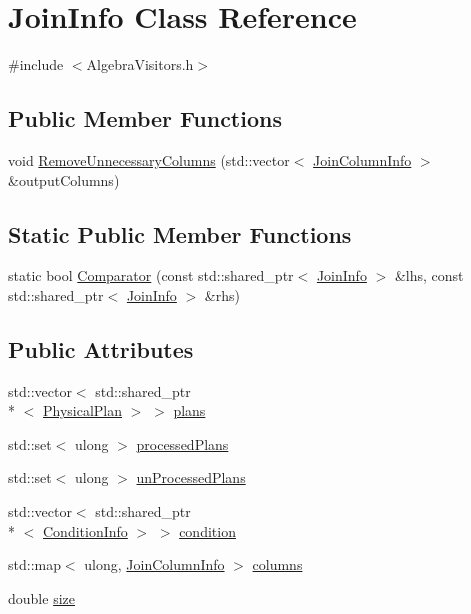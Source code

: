 \hypertarget{class_join_info}{\section{Join\+Info Class Reference}
\label{class_join_info}
}


{\ttfamily \#include $<$Algebra\+Visitors.\+h$>$}

\subsection*{Public Member Functions}
\begin{DoxyCompactItemize}
\item 
void \hyperlink{class_join_info_aa4c03bd8c1d0a7f4a5b89287d69f89b5}{Remove\+Unnecessary\+Columns} (std\+::vector$<$ \hyperlink{class_join_column_info}{Join\+Column\+Info} $>$ \&output\+Columns)
\end{DoxyCompactItemize}
\subsection*{Static Public Member Functions}
\begin{DoxyCompactItemize}
\item 
static bool \hyperlink{class_join_info_ae7be09d7cdeb95ad59d9352ee37de990}{Comparator} (const std\+::shared\+\_\+ptr$<$ \hyperlink{class_join_info}{Join\+Info} $>$ \&lhs, const std\+::shared\+\_\+ptr$<$ \hyperlink{class_join_info}{Join\+Info} $>$ \&rhs)
\end{DoxyCompactItemize}
\subsection*{Public Attributes}
\begin{DoxyCompactItemize}
\item 
std\+::vector$<$ std\+::shared\+\_\+ptr\\*
$<$ \hyperlink{class_physical_plan}{Physical\+Plan} $>$ $>$ \hyperlink{class_join_info_acbddcf9cd01e91396492b94a627bdf69}{plans}
\item 
std\+::set$<$ ulong $>$ \hyperlink{class_join_info_a584f1ea54151c8e0c506911a6595c7cb}{processed\+Plans}
\item 
std\+::set$<$ ulong $>$ \hyperlink{class_join_info_ac6d0b302590c265ce7f3c47db28bad44}{un\+Processed\+Plans}
\item 
std\+::vector$<$ std\+::shared\+\_\+ptr\\*
$<$ \hyperlink{class_condition_info}{Condition\+Info} $>$ $>$ \hyperlink{class_join_info_a0b9f3b02df4e768208f53c549e0b6e61}{condition}
\item 
std\+::map$<$ ulong, \hyperlink{class_join_column_info}{Join\+Column\+Info} $>$ \hyperlink{class_join_info_a4890e0bbeaf9718d16765b8f408ec1b5}{columns}
\item 
double \hyperlink{class_join_info_a526146b07ef6d1bba7475f7998bf0588}{size}
\end{DoxyCompactItemize}


